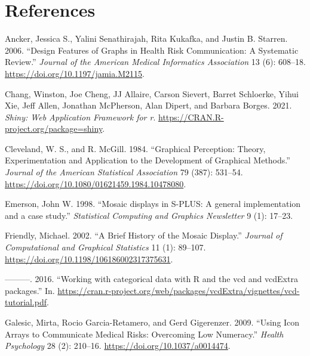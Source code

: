 \hypertarget{references-1}{%
\section*{References}\label{references-1}}

\hypertarget{refs}{}
\begin{CSLReferences}{1}{0}
\leavevmode{}%
Ancker, Jessica S., Yalini Senathirajah, Rita Kukafka, and Justin B. Starren. 2006. {``Design Features of Graphs in Health Risk Communication: A Systematic Review.''} \emph{Journal of the American Medical Informatics Association} 13 (6): 608--18. \url{https://doi.org/10.1197/jamia.M2115}.

\leavevmode{}%
Chang, Winston, Joe Cheng, JJ Allaire, Carson Sievert, Barret Schloerke, Yihui Xie, Jeff Allen, Jonathan McPherson, Alan Dipert, and Barbara Borges. 2021. \emph{Shiny: Web Application Framework for r}. \url{https://CRAN.R-project.org/package=shiny}.

\leavevmode{}%
Cleveland, W. S., and R. McGill. 1984. {``Graphical Perception: Theory, Experimentation and Application to the Development of Graphical Methods.''} \emph{Journal of the American Statistical Association} 79 (387): 531--54. \url{https://doi.org/10.1080/01621459.1984.10478080}.

\leavevmode{}%
Emerson, John W. 1998. {``{Mosaic displays in S-PLUS: A general implementation and a case study}.''} \emph{Statistical Computing and Graphics Newsletter} 9 (1): 17--23.

\leavevmode{}%
Friendly, Michael. 2002. {``A Brief History of the Mosaic Display.''} \emph{Journal of Computational and Graphical Statistics} 11 (1): 89--107. \url{https://doi.org/10.1198/106186002317375631}.

\leavevmode{}%
---------. 2016. {``{Working with categorical data with R and the vcd and vcdExtra packages}.''} In. \url{https://cran.r-project.org/web/packages/vcdExtra/vignettes/vcd-tutorial.pdf}.

\leavevmode{}%
Galesic, Mirta, Rocio Garcia-Retamero, and Gerd Gigerenzer. 2009. {``Using Icon Arrays to Communicate Medical Risks: Overcoming Low Numeracy.''} \emph{Health Psychology} 28 (2): 210--16. \url{https://doi.org/10.1037/a0014474}.


\end{CSLReferences}

